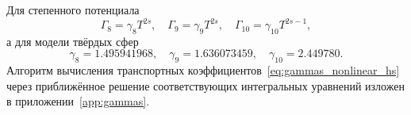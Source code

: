 Для степенного потенциала
\begin{equation}\label{eq:gammas_nonlinear}
    \Gamma_8 = \gamma_8 T^{2s},
        \quad \Gamma_9 = \gamma_9 T^{2s},
        \quad \Gamma_{10} = \gamma_{10} T^{2s-1},
\end{equation}
а для модели твёрдых сфер
\begin{equation}\label{eq:gammas_nonlinear_hs}
    \gamma_8 = 1.495941968, \quad \gamma_9 = 1.636073459, \quad \gamma_{10} = 2.449780.
\end{equation}
Алгоритм вычисления транспортных коэффициентов~\eqref{eq:gammas_nonlinear_hs} через приближённое решение
соответствующих интегральных уравнений изложен в приложении~\ref{app:gammas}.

\clearpage
